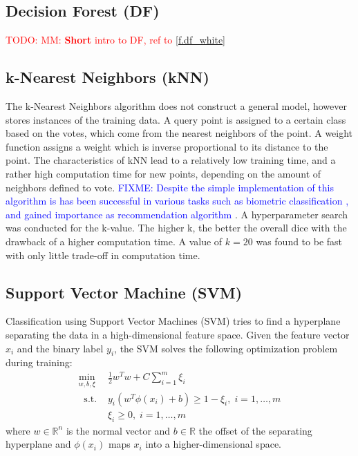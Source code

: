 \documentclass[journal]{IEEEtran}
\newcommand\TODO[1]{\textcolor{red}{TODO: #1}}
\newcommand\FIXME[1]{\textcolor{blue}{FIXME: #1}}
\begin{document}
\subsection{Decision Forest (DF)}
\TODO{MM: \textbf{Short} intro to DF, ref to \ref{f.df_white}}

\subsection{k-Nearest Neighbors (kNN)}
The k-Nearest Neighbors algorithm does not construct a general model, however stores instances of the training data. A query point is assigned to a certain class based on the votes, which come from the nearest neighbors of the point. A weight function assigns a weight which is inverse proportional to its distance to the point. The characteristics of kNN lead to a relatively low training time, and a rather high computation time for new points, depending on the amount of neighbors defined to vote. \FIXME{Despite the simple implementation of this algorithm is has been successful in various tasks such as biometric classification \cite{Dhriti2012}, and gained importance as recommendation algorithm \cite{Sarwar2001}}. A hyperparameter search was conducted for the k-value. The higher k, the better the overall dice with the drawback of a higher computation time. A value of $k=20$ was found to be fast with only little trade-off in computation time.

\subsection{Support Vector Machine (SVM)}
Classification using Support Vector Machines (SVM) tries to find a hyperplane separating the data in a high-dimensional feature space. Given the feature vector $x_i$ and the binary label $y_i$, the SVM solves the following optimization problem during training:
\begin{equation}
\begin{split}
\min_{w, b, \xi} \ & \frac{1}{2}w^Tw + C\sum_{i=1}^m \xi_i \\
\ \text{ s.t. } & y_i(w^T\phi(x_i)+b) \geq 1-\xi_i, \; i = 1, \ldots, m \\
& \xi_i \geq 0, \; i = 1, \ldots, m
\end{split}
\end{equation}
where $w\in \mathbb{R}^n $ is the normal vector and $b \in \mathbb{R}$ the offset of the separating hyperplane and $\phi(x_i)$ maps $x_i$ into a higher-dimensional space.
\end{document}
